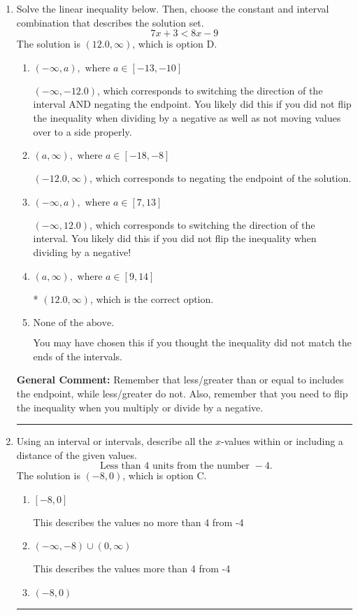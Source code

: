 \documentclass{extbook}[14pt]
\newcommand{\litem}[1]{\item #1

\rule{\textwidth}{0.4pt}}
\begin{document}
\begin{enumerate}\litem{
Solve the linear inequality below. Then, choose the constant and interval combination that describes the solution set.
\[ 7x + 3 < 8x -9 \]The solution is \( (12.0, \infty) \), which is option D.\begin{enumerate}[label=\Alph*.]
\item \( (-\infty, a), \text{ where } a \in [-13, -10] \)

 $(-\infty, -12.0)$, which corresponds to switching the direction of the interval AND negating the endpoint. You likely did this if you did not flip the inequality when dividing by a negative as well as not moving values over to a side properly.
\item \( (a, \infty), \text{ where } a \in [-18, -8] \)

 $(-12.0, \infty)$, which corresponds to negating the endpoint of the solution.
\item \( (-\infty, a), \text{ where } a \in [7, 13] \)

 $(-\infty, 12.0)$, which corresponds to switching the direction of the interval. You likely did this if you did not flip the inequality when dividing by a negative!
\item \( (a, \infty), \text{ where } a \in [9, 14] \)

* $(12.0, \infty)$, which is the correct option.
\item \( \text{None of the above}. \)

You may have chosen this if you thought the inequality did not match the ends of the intervals.
\end{enumerate}

\textbf{General Comment:} Remember that less/greater than or equal to includes the endpoint, while less/greater do not. Also, remember that you need to flip the inequality when you multiply or divide by a negative.
}
\litem{
Using an interval or intervals, describe all the $x$-values within or including a distance of the given values.
\[ \text{ Less than } 4 \text{ units from the number } -4. \]The solution is \( (-8, 0) \), which is option C.\begin{enumerate}[label=\Alph*.]
\item \( [-8, 0] \)

This describes the values no more than 4 from -4
\item \( (-\infty, -8) \cup (0, \infty) \)

This describes the values more than 4 from -4
\item \( (-8, 0) \)


\end{enumerate}}
\end{enumerate}
\end{document}
